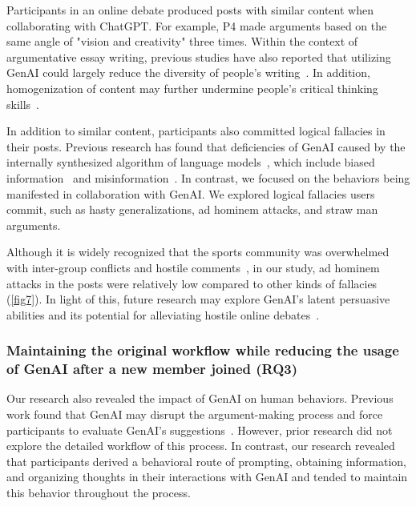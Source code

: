 Participants in an online debate produced posts with similar content when collaborating with ChatGPT. For example, P4 made  arguments based on the same angle of "vision and creativity" three times. Within the context of argumentative essay writing, previous studies have also reported that utilizing GenAI could largely reduce the diversity of people's writing~\cite{li_value_2024}. In addition, homogenization of content may further undermine people's critical thinking skills~\cite{razi_not_2024}.


In addition to similar content, participants also committed logical fallacies in their posts. Previous research has found that deficiencies of GenAI caused by the internally synthesized algorithm of language models~\cite{fischer_generative_2023, razi_not_2024}, which include biased information~\cite{razi_not_2024} and misinformation~\cite{fischer_generative_2023, zhou_understanding_2024}. In contrast, we focused on the behaviors being manifested in collaboration with GenAI. We explored logical fallacies users commit, such as hasty generalizations, ad hominem attacks, and straw man arguments.

Although it is widely recognized that the sports community was overwhelmed with inter-group conflicts and hostile comments~\cite{wang_making_2023, zhang_intergroup_2019}, in our study, ad hominem attacks in the posts were relatively low compared to other kinds of fallacies (\autoref{fig7}). In light of this, future research may explore GenAI's latent persuasive abilities and its potential for alleviating hostile online debates~\cite{jakesch_co-writing_2023}.

\subsubsection{Maintaining the original workflow while reducing the usage of GenAI after a new member joined (RQ3)}

Our research also revealed the impact of GenAI on human behaviors. Previous work found that GenAI may disrupt the argument-making process and force participants to evaluate GenAI's suggestions~\cite{jakesch_co-writing_2023}.  However, prior research did not explore the detailed workflow of this process. In contrast, our research revealed that participants derived a behavioral route of prompting, obtaining information, and organizing thoughts in their interactions with GenAI and tended to maintain this behavior throughout the process. 

